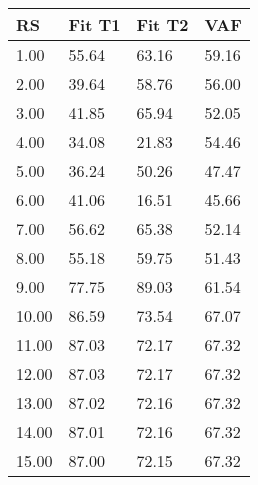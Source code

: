 \begin{tabular}{llll}
RS & Fit T1 & Fit T2 & VAF \\ 
\hline 
 1.00 & 55.64 & 63.16 & 59.16 \\ 
 2.00 & 39.64 & 58.76 & 56.00 \\ 
 3.00 & 41.85 & 65.94 & 52.05 \\ 
 4.00 & 34.08 & 21.83 & 54.46 \\ 
 5.00 & 36.24 & 50.26 & 47.47 \\ 
 6.00 & 41.06 & 16.51 & 45.66 \\ 
 7.00 & 56.62 & 65.38 & 52.14 \\ 
 8.00 & 55.18 & 59.75 & 51.43 \\ 
 9.00 & 77.75 & 89.03 & 61.54 \\ 
10.00 & 86.59 & 73.54 & 67.07 \\ 
11.00 & 87.03 & 72.17 & 67.32 \\ 
12.00 & 87.03 & 72.17 & 67.32 \\ 
13.00 & 87.02 & 72.16 & 67.32 \\ 
14.00 & 87.01 & 72.16 & 67.32 \\ 
15.00 & 87.00 & 72.15 & 67.32 \\ 
\hline 
\end{tabular}